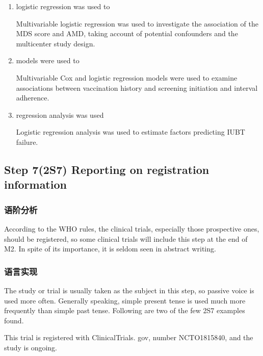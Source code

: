 \documentclass[a4paper]{ctexbook}
\begin{document}
    \begin{enumerate}
      \item logistic regression was used to
      \begin{eg}{}
        Multivariable logistic regression was used to investigate the association of the MDS score and AMD, taking account of potential confounders and the multicenter study design.   
      \end{eg}
      \item models were used to
      \begin{eg}{}
        Multivariable Cox and logistic regression models were used to examine associations between vaccination history and screening initiation and interval adherence. 
      \end{eg}
      \item regression analysis was used
      \begin{eg}{}
        Logistic regression analysis was used to estimate factors predicting IUBT failure.   
      \end{eg}
    \end{enumerate}

  \subsection{Step 7(2S7) Reporting on registration information}

    \subsubsection{语阶分析}

    According to the WHO rules, the clinical trials, especially those prospective ones, should be registered, so some clinical trials will include this step at the end of M2. In spite of its importance, it is seldom seen in abstract writing.

    \subsubsection{语言实现}

    The study or trial is usually taken as the subject in this step, so passive voice is used more often. Generally speaking, simple present tense is used much more frequently than simple past tense. Following are two of the few 2S7 examples found.

    \begin{eg}{}
      This trial is registered with ClinicalTrials. gov, number NCTO1815840, and the study is ongoing.
    \end{eg}
\end{document}
